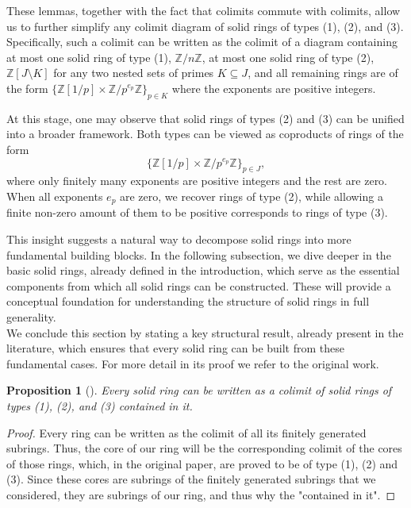 \documentclass{amsart}
\newtheorem{proposition}[subsection]{Proposition}
\newcommand{\Z}{{\mathbb Z}}
\begin{document}
    These lemmas, together with the fact that colimits commute with colimits, allow us to further simplify any colimit diagram of solid rings of types (1), (2), and (3).
    Specifically, such a colimit can be written as the colimit of a diagram containing at most one solid ring of type (1), $\Z/n\Z$, at most one solid ring of type (2), $\Z[J\setminus K]$ for any two nested sets of primes $K \subseteq J$, and all remaining rings are of the form $\{\Z[1/p] \times \Z/p^{e_p}\Z\}_{p \in K}$ where the exponents are positive integers.

    At this stage, one may observe that solid rings of types (2) and (3) can be unified into a broader framework.
    Both types can be viewed as coproducts of rings of the form
    $$
    \{\Z[1/p] \times \Z/p^{e_p}\Z\}_{p \in J},
    $$
    where only finitely many exponents are positive integers and the rest are zero.
    When all exponents $e_p$ are zero, we recover rings of type (2), while allowing a finite non-zero amount of them to be positive corresponds to rings of type (3).

    This insight suggests a natural way to decompose solid rings into more fundamental building blocks.
    In the following subsection, we dive deeper in the basic solid rings, already defined in the introduction, which serve as the essential components from which all solid rings can be constructed.
    These will provide a conceptual foundation for understanding the structure of solid rings in full generality.\\

    We conclude this section by stating a key structural result, already present in the literature, which ensures that every solid ring can be built from these fundamental cases.
    For more detail in its proof we refer to the original work.
    
    \begin{proposition}[{\cite[Proposition 3.1]{BK71}}]
    \label{prp:co_solid_3}
    \label{prp:co_solid_4}
        Every solid ring can be written as a colimit of solid rings of types (1), (2), and (3) contained in it.
    \end{proposition}
    \begin{proof}
    	Every ring can be written as the colimit of all its finitely generated subrings.
    	Thus, the core of our ring will be the corresponding colimit of the cores of those rings, which, in the original paper, are proved to be of type (1), (2) and (3).
    	Since these cores are subrings of the finitely generated subrings that we considered, they are subrings of our ring, and thus why the "contained in it".
    \end{proof}
   
\end{document}
